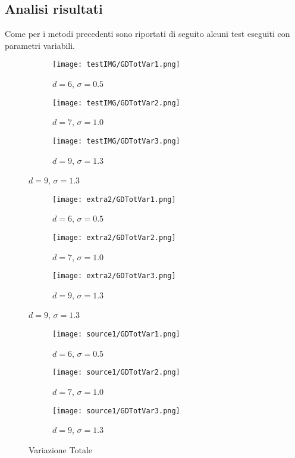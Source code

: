 \documentclass{article}
\begin{document}
\newpage

\subsection{Analisi risultati}
Come per i metodi precedenti sono riportati di seguito alcuni test eseguiti con parametri variabili. 

\begin{figure}[h]
\begin{subfigure}{0.32\textwidth}
    \texttt{[image: testIMG/GDTotVar1.png]}
    \caption{$d=6$, $\sigma=0.5$}
    \label{fig:first}
\end{subfigure}%
    \hfill
\begin{subfigure}{0.32\textwidth}
    \texttt{[image: testIMG/GDTotVar2.png]}
        \caption{$d=7$, $\sigma=1.0$}
    \label{fig:second}
\end{subfigure}%
\hfill
\begin{subfigure}{0.32\textwidth}
    \texttt{[image: testIMG/GDTotVar3.png]}
        \caption{$d=9$, $\sigma=1.3$}
    \label{fig:third}
\end{subfigure}
\label{fig:figures}
\end{figure}
\begin{figure}[h]
\begin{subfigure}{0.3\textwidth}
    \texttt{[image: extra2/GDTotVar1.png]}
    \caption{$d=6$, $\sigma=0.5$}
    \label{fig:first}
\end{subfigure}%
    \hfill
\begin{subfigure}{0.3\textwidth}
    \texttt{[image: extra2/GDTotVar2.png]}
        \caption{$d=7$, $\sigma=1.0$}
    \label{fig:second}
\end{subfigure}%
\hfill
\begin{subfigure}{0.3\textwidth}
    \texttt{[image: extra2/GDTotVar3.png]}
        \caption{$d=9$, $\sigma=1.3$}
    \label{fig:third}
\end{subfigure}
\label{fig:figures}
\end{figure}
\begin{figure}[h]
\begin{subfigure}{0.27\textwidth}
    \texttt{[image: source1/GDTotVar1.png]}
    \caption{$d=6$, $\sigma=0.5$}
    \label{fig:first}
\end{subfigure}%
    \hfill
\begin{subfigure}{0.27\textwidth}
    \texttt{[image: source1/GDTotVar2.png]}
        \caption{$d=7$, $\sigma=1.0$}
    \label{fig:second}
\end{subfigure}%
\hfill
\begin{subfigure}{0.27\textwidth}
    \texttt{[image: source1/GDTotVar3.png]} 
        \caption{$d=9$, $\sigma=1.3$}
    \label{fig:third}
\end{subfigure}
\caption{Variazione Totale}
\label{fig:figures}
\end{figure}
\end{document}
